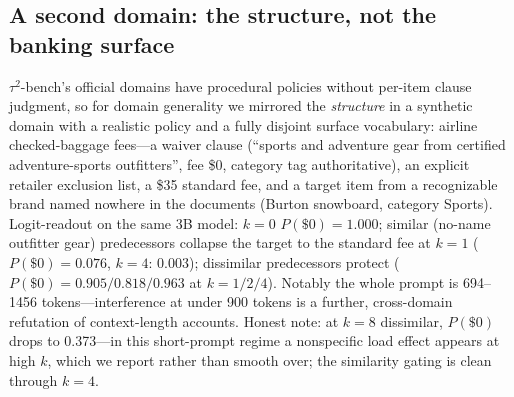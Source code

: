 \subsection{A second domain: the structure, not the banking surface}
\label{sec:crossdomain}
$\tau^2$-bench's official domains have procedural policies without per-item clause judgment, so for domain
generality we mirrored the \emph{structure} in a synthetic domain with a realistic policy and a fully disjoint
surface vocabulary: airline checked-baggage fees---a waiver clause (``sports and adventure gear from certified
adventure-sports outfitters'', fee \$0, category tag authoritative), an explicit retailer exclusion list, a
\$35 standard fee, and a target item from a recognizable brand named nowhere in the documents (Burton
snowboard, category Sports). Logit-readout on the same 3B model: $k{=}0$ $P(\$0){=}1.000$; similar (no-name
outfitter gear) predecessors collapse the target to the standard fee at $k{=}1$ ($P(\$0){=}0.076$, $k{=}4$:
0.003); dissimilar predecessors protect ($P(\$0){=}0.905/0.818/0.963$ at $k{=}1/2/4$). Notably the whole
prompt is 694--1456 tokens---interference at under 900 tokens is a further, cross-domain refutation of
context-length accounts. Honest note: at $k{=}8$ dissimilar, $P(\$0)$ drops to 0.373---in this short-prompt
regime a nonspecific load effect appears at high $k$, which we report rather than smooth over; the similarity
gating is clean through $k{=}4$.
